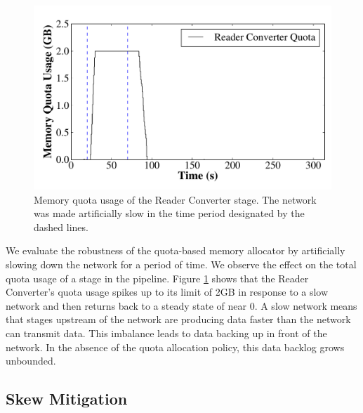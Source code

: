 \begin{figure}
\includegraphics[width=\columnwidth]{themis/graphs/reader_converter_quota_slow_network.pdf}
\caption{\label{fig:reader_converter_quota_slow_network} Memory quota usage of
  the Reader Converter stage. The network was made artificially slow in the
  time period designated by the dashed lines.}
\end{figure}

We evaluate the robustness of the quota-based memory allocator by artificially
slowing down the network for a period of time. We observe the effect on the
total quota usage of a stage in the pipeline. Figure
\ref{fig:reader_converter_quota_slow_network} shows that the Reader Converter's
quota usage spikes up to its limit of 2GB in response to a slow network and
then returns back to a steady state of near 0. A slow network means that stages
upstream of the network are producing data faster than the network can transmit
data. This imbalance leads to data backing up in front of the
network. In the absence of the quota allocation policy, this data backlog grows
unbounded.

\subsection{Skew Mitigation}

